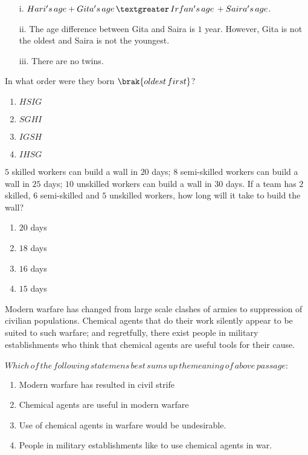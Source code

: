     \begin{enumerate}
     \item[i.] $Hari's\, age + Gita's\, age\, \textgreater \, Irfan's\, age\, + Saira's\, age$. 
    \item[ii.] The age difference between Gita and Saira is $1$ year. However, Gita is not the oldest and Saira is not the youngest.
    \item[iii.] There are no twins. 
    \end{enumerate}
    In what order were they born $\brak{oldest\, first}$?
    \begin{enumerate}
        \item $HSIG$
        \item $SGHI$
        \item $IGSH$
        \item $IHSG$
    \end{enumerate}
    \item $5$ skilled workers can build a wall in $20$ days; $8$ semi-skilled workers can build a wall in $25$ days; $10$ unskilled workers can build a wall in $30$ days. If a team has $2$ skilled, $6$ semi-skilled and $5$ unskilled workers, how long will it take to build the wall?
    \begin{enumerate}
        \item $20$ days
        \item $18$ days
        \item $16$ days
        \item $15$ days
    \end{enumerate}
    \item Modern warfare has changed from large scale clashes of armies to suppression of civilian populations. Chemical agents that do their work silently appear to be suited to such warfare; and regretfully, there exist people in military establishments who think that chemical agents are useful tools for their cause.\\ \\
    $Which\,of\,the\,following\,statemens\,best\,sums\,up\,the meaning\,of\,above\,passage\colon$
    \begin{enumerate}
        \item Modern warfare has resulted in civil strife
        \item Chemical agents are useful in modern warfare
        \item Use of chemical agents in warfare would be undesirable.
        \item People in military establishments like to use chemical agents in war.
    \end{enumerate}
